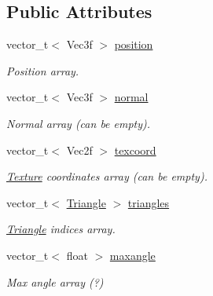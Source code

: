 \subsection*{Public Attributes}
\begin{DoxyCompactItemize}
\item 
vector\_\-t$<$ Vec3f $>$ \hyperlink{classembree_1_1_triangle_mesh_consistent_normals_ac123e3f2933e7ba9983a46e35da96e3c}{position}
\begin{DoxyCompactList}\small\item\em Position array. \item\end{DoxyCompactList}\item 
vector\_\-t$<$ Vec3f $>$ \hyperlink{classembree_1_1_triangle_mesh_consistent_normals_a847dd1f07b178d54ee7da385d0d58f6f}{normal}
\begin{DoxyCompactList}\small\item\em Normal array (can be empty). \item\end{DoxyCompactList}\item 
vector\_\-t$<$ Vec2f $>$ \hyperlink{classembree_1_1_triangle_mesh_consistent_normals_aea3e6097dde4ed0fbd5e4050dc61d5c1}{texcoord}
\begin{DoxyCompactList}\small\item\em \hyperlink{classembree_1_1_texture}{Texture} coordinates array (can be empty). \item\end{DoxyCompactList}\item 
vector\_\-t$<$ \hyperlink{structembree_1_1_triangle_mesh_consistent_normals_1_1_triangle}{Triangle} $>$ \hyperlink{classembree_1_1_triangle_mesh_consistent_normals_aa707ca2ad499a3073debfc02ef1bf6c6}{triangles}
\begin{DoxyCompactList}\small\item\em \hyperlink{structembree_1_1_triangle_mesh_consistent_normals_1_1_triangle}{Triangle} indices array. \item\end{DoxyCompactList}\item 
\hypertarget{classembree_1_1_triangle_mesh_consistent_normals_ae7e322b5010d1708dbea32dd89af2bd6}{
vector\_\-t$<$ float $>$ \hyperlink{classembree_1_1_triangle_mesh_consistent_normals_ae7e322b5010d1708dbea32dd89af2bd6}{maxangle}}
\label{classembree_1_1_triangle_mesh_consistent_normals_ae7e322b5010d1708dbea32dd89af2bd6}

\begin{DoxyCompactList}\small\item\em Max angle array (?) \item\end{DoxyCompactList}\end{DoxyCompactItemize}


